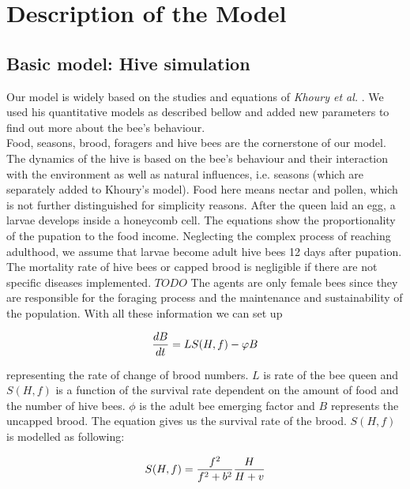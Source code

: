 \section{Description of the Model}
\subsection{Basic model: Hive simulation}
	Our model is widely based on the studies and equations of \textit{Khoury et al.} \cite{khoury13}. We used his quantitative models as described bellow and added new parameters to find out more about the bee's behaviour.\\
	Food, seasons, brood, foragers and hive bees are the cornerstone of our model. The dynamics of the hive is based on the bee's behaviour and their interaction with the environment as well as natural influences, i.e. seasons (which are separately added to Khoury's model). Food here means nectar and pollen, which is not further distinguished for simplicity reasons. After the queen laid an egg, a larvae develops inside a honeycomb cell. The equations show the proportionality of the pupation to the food income. Neglecting the complex process of reaching adulthood, we assume that larvae become adult hive bees 12 days after pupation. The mortality rate of hive bees or capped brood is negligible if there are not specific diseases implemented. $TODO$ The agents are only female bees since they are responsible for the foraging process and the maintenance and sustainability of the population. With all these information we can set up
	
	\begin{equation}\label{eq:changeBroodNumbers}
		{dB \over dt} = LS(H,f)-\phi B
	\end{equation}
	
	representing the rate of change of brood numbers. $L$ is  rate of the bee queen and $S(H,f)$ is a function of the survival rate dependent on the amount of food and  the number of hive bees. $\phi$ is the adult bee emerging factor and $B$ represents the uncapped brood. The equation gives us the survival rate of the brood. $S(H,f)$ is modelled as following:
	
	\begin{equation}\label{eq:functionHiveBeesFood}
		S(H,f)={f^2 \over f^2+b^2}{H \over H+v}
	\end{equation}
	
